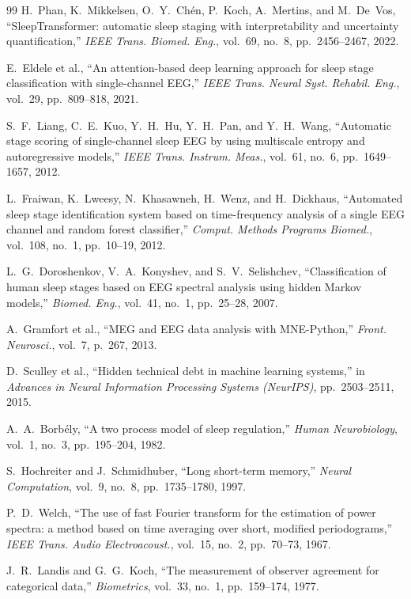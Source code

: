 \documentclass[10pt]{article}
\begin{document}
\begin{thebibliography}{99}
H.~Phan, K.~Mikkelsen, O.~Y.~Ch{\'{e}}n, P.~Koch, A.~Mertins, and M.~De~Vos, ``SleepTransformer: automatic sleep staging with interpretability and uncertainty quantification,'' \textit{IEEE Trans. Biomed. Eng.}, vol.~69, no.~8, pp.~2456--2467, 2022.

E.~Eldele et al., ``An attention-based deep learning approach for sleep stage classification with single-channel EEG,'' \textit{IEEE Trans. Neural Syst. Rehabil. Eng.}, vol.~29, pp.~809--818, 2021.

S.~F.~Liang, C.~E.~Kuo, Y.~H.~Hu, Y.~H.~Pan, and Y.~H.~Wang, ``Automatic stage scoring of single-channel sleep EEG by using multiscale entropy and autoregressive models,'' \textit{IEEE Trans. Instrum. Meas.}, vol.~61, no.~6, pp.~1649--1657, 2012.

L.~Fraiwan, K.~Lweesy, N.~Khasawneh, H.~Wenz, and H.~Dickhaus, ``Automated sleep stage identification system based on time-frequency analysis of a single EEG channel and random forest classifier,'' \textit{Comput. Methods Programs Biomed.}, vol.~108, no.~1, pp.~10--19, 2012.

L.~G.~Doroshenkov, V.~A.~Konyshev, and S.~V.~Selishchev, ``Classification of human sleep stages based on EEG spectral analysis using hidden Markov models,'' \textit{Biomed. Eng.}, vol.~41, no.~1, pp.~25--28, 2007.

A.~Gramfort et al., ``MEG and EEG data analysis with MNE-Python,'' \textit{Front. Neurosci.}, vol.~7, p.~267, 2013.

D.~Sculley et al., ``Hidden technical debt in machine learning systems,'' in \textit{Advances in Neural Information Processing Systems (NeurIPS)}, pp.~2503--2511, 2015.

A.~A.~Borb{\'e}ly, ``A two process model of sleep regulation,'' \textit{Human Neurobiology}, vol.~1, no.~3, pp.~195--204, 1982.

S.~Hochreiter and J.~Schmidhuber, ``Long short-term memory,'' \textit{Neural Computation}, vol.~9, no.~8, pp.~1735--1780, 1997.

P.~D.~Welch, ``The use of fast Fourier transform for the estimation of power spectra: a method based on time averaging over short, modified periodograms,'' \textit{IEEE Trans. Audio Electroacoust.}, vol.~15, no.~2, pp.~70--73, 1967.

J.~R.~Landis and G.~G.~Koch, ``The measurement of observer agreement for categorical data,'' \textit{Biometrics}, vol.~33, no.~1, pp.~159--174, 1977.

\end{thebibliography}
\end{document}
